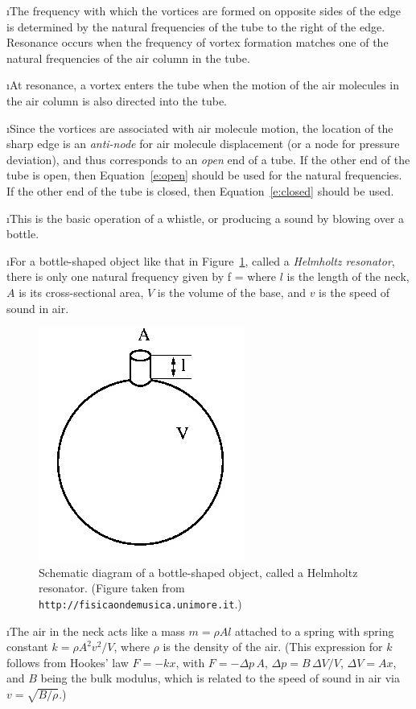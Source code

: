 \i The frequency with which the vortices
are formed on opposite sides of the edge
is determined by the natural frequencies of 
the tube to the right of the edge.
Resonance occurs when the frequency of 
vortex formation matches one of the natural 
frequencies of the air column in the tube.

\i At resonance, a vortex enters the tube 
when the motion of the air molecules in the air 
column is also directed into the tube.

\i Since the vortices are associated with
air molecule motion, the location of the 
sharp edge is an {\em anti-node} for air molecule 
displacement (or a node for pressure deviation), 
and thus corresponds to an {\em open} end of a tube.
If the other end of the tube is open, 
then Equation~\ref{e:open} 
should be used for the natural frequencies.
If the other end of the tube is closed, 
then Equation~\ref{e:closed} should be used.

\i This is the basic operation of a 
whistle, or producing a sound by blowing
over a bottle.

\i \ex For a bottle-shaped object like that in 
Figure~\ref{f:helmholtzresonator},
called a {\em Helmholtz resonator},
there is only one natural frequency given by
%
\be
f = 
\ee
%
where $l$ is the length of the neck, $A$ is its
cross-sectional area, $V$ is the volume of 
the base, and $v$ is the speed of sound in air.
%
\begin{figure}[htbp]
\begin{center}
\includegraphics[width=.3\textwidth]{helmholtzresonator.jpg}
\caption{Schematic diagram of a bottle-shaped object, 
called a Helmholtz resonator.
(Figure taken from {\tt http://fisicaondemusica.unimore.it}.)}
\label{f:helmholtzresonator}
\end{center}
\end{figure}

\i The air in the neck acts like a mass 
$m = \rho A l$ attached to a spring with spring constant
$k = {\rho A^2 v^2}/{V}$, where $\rho$ is the density
of the air.
(This expression for $k$ follows from Hookes' law 
$F=-kx$, with 
$F= -\Delta p\, A$, $\Delta p = B\,\Delta V/V$, $\Delta V = Ax$,
and $B$ being the bulk modulus, which is related to the speed
of sound in air via $v= \sqrt{B/\rho}$.)

